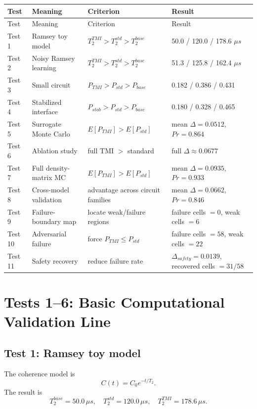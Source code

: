 \documentclass[12pt,a4paper]{article}
\begin{document}
\begin{longtable}{p{2.0cm}p{4.0cm}p{4.2cm}p{5.0cm}}
\toprule
Test & Meaning & Criterion & Result \\
\midrule
\endfirsthead
\toprule
Test & Meaning & Criterion & Result \\
\midrule
\endhead

Test 1 & Ramsey toy model & $T_2^{TMI}>T_2^{std}>T_2^{base}$ & 50.0 / 120.0 / 178.6 $\mu s$ \\
Test 2 & Noisy Ramsey learning & $T_2^{TMI}>T_2^{std}>T_2^{base}$ & 51.3 / 125.8 / 162.4 $\mu s$ \\
Test 3 & Small circuit & $P_{TMI}>P_{std}>P_{base}$ & 0.182 / 0.386 / 0.431 \\
Test 4 & Stabilized interface & $P_{stab}>P_{std}>P_{base}$ & 0.180 / 0.328 / 0.465 \\
Test 5 & Surrogate Monte Carlo & $E[P_{TMI}]>E[P_{std}]$ & mean $\Delta=0.0512$, $Pr=0.864$ \\
Test 6 & Ablation study & full TMI $>$ standard & full $\Delta\approx 0.0677$ \\
Test 7 & Full density-matrix MC & $E[P_{TMI}]>E[P_{std}]$ & mean $\Delta=0.0935$, $Pr=0.933$ \\
Test 8 & Cross-model validation & advantage across circuit families & mean $\Delta=0.0662$, $Pr=0.846$ \\
Test 9 & Failure-boundary map & locate weak/failure regions & failure cells $=0$, weak cells $=6$ \\
Test 10 & Adversarial failure & force $P_{TMI}\le P_{std}$ & failure cells $=58$, weak cells $=22$ \\
Test 11 & Safety recovery & reduce failure rate & $\Delta_{safety}=0.0139$, recovered cells $=31/58$ \\

\bottomrule
\end{longtable}

\section{Tests 1--6: Basic Computational Validation Line}

\subsection{Test 1: Ramsey toy model}

The coherence model is
\[
C(t)=C_0 e^{-t/T_2}.
\]
The result is
\[
T_2^{base}=50.0\,\mu s,
\quad
T_2^{std}=120.0\,\mu s,
\quad
T_2^{TMI}=178.6\,\mu s.
\]
\end{document}
